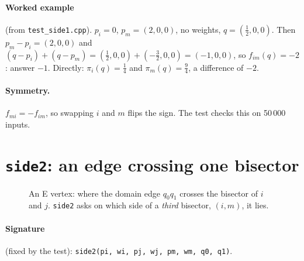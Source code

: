 \documentclass[11pt,a4paper]{article}
\newcommand{\code}[1]{\texttt{#1}}
\theoremstyle{remark}
\begin{document}
\paragraph{Worked example} (from \code{test\_side1.cpp}). $p_i = 0$, $p_m = (2,0,0)$, no
weights, $q = (\tfrac12, 0, 0)$. Then $p_m - p_i = (2,0,0)$ and
$(q - p_i) + (q - p_m) = (\tfrac12,0,0) + (-\tfrac32,0,0) = (-1,0,0)$, so $f_{im}(q) = -2$:
answer $-1$. Directly: $\pi_i(q) = \tfrac14$ and $\pi_m(q) = \tfrac94$, a difference of $-2$.

\paragraph{Symmetry.} $f_{mi} = -f_{im}$, so swapping $i$ and $m$ flips the sign. The test
checks this on 50\,000 inputs.

\section{\texorpdfstring{\code{side2}}{side2}: an edge crossing one bisector}\label{sec:side2}

\begin{figure}[ht]
\centering
{}
\caption{An E vertex: where the domain edge $q_0q_1$ crosses the bisector of $i$ and $j$.
\code{side2} asks on which side of a \emph{third} bisector, $(i,m)$, it lies.}
\label{fig:side2}
\end{figure}

\paragraph{Signature} (fixed by the test):
\code{side2(pi, wi, pj, wj, pm, wm, q0, q1)}.
\end{document}
